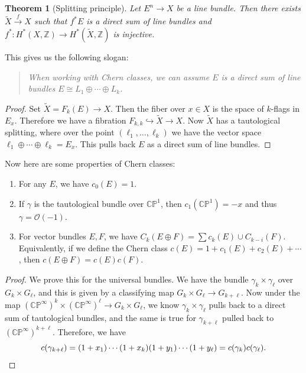 \documentclass[leqno, openany]{memoir}
\newtheorem{thm}{Theorem}[section]
\theoremstyle{definition}
\theoremstyle{remark}
\theoremstyle{plain}
\theoremstyle{definition}
\theoremstyle{remark}
\newcommand{\C}{\mathbb{C}}
\newcommand{\Z}{\mathbb{Z}}
\renewcommand{\P}{\mathbb{P}}
\newcommand{\mc}[1]{\mathcal{#1}}
\newcommand{\wt}[1]{\widetilde{#1}}
\begin{document}
\begin{thm}[Splitting principle] Let $E^n \to X$ be a line bundle. Then there
exists $\wt{X} \xrightarrow{f} X$ such that $f^* E$ is a direct sum of line
bundles and $f^* \colon H^*(X, \Z) \to H^*(\wt{X}, \Z)$ is injective.
\end{thm} This gives us the following slogan: \begin{quotation} \textit{When
working with Chern classes, we can assume $E$ is a direct sum of line bundles
$E \cong L_1 \oplus \cdots \oplus L_k$.} \end{quotation}

\begin{proof} Set $\wt{X} = F_k(E) \to X$. Then the fiber over $x \in X$ is the
    space of $k$-flags in $E_x$. Therefore we have a fibration $F_{k,k}
    \hookrightarrow \wt{X} \to X$. Now $\wt{X}$ has a tautological splitting,
    where over the point $(\ell_1, \ldots, \ell_k)$ we have the vector space
    $\ell_1 \oplus \cdots \oplus \ell_k = E_x$. This pulls back $E$ as a direct
    sum of line bundles.  \end{proof}

Now here are some properties of Chern classes: \begin{enumerate} \item For any
    $E$, we have $c_0(E) = 1$.  \item If $\gamma$ is the tautological bundle
    over $\C\P^1$, then $c_1(\C\P^1) = -x$ and thus $\gamma = \mc{O}(-1)$.
\item For vector bundles $E, F$, we have $C_k(E \oplus F) = \sum c_k(E) \cup
    C_{k-i}(F)$. Equivalently, if we define the Chern class $c(E) = 1 + c_1(E)
    + c_2(E) + \cdots$, then $c(E \oplus F) = c(E) c(F)$.  \end{enumerate}

\begin{proof} We prove this for the universal bundles. We have the bundle
    $\gamma_k \times \gamma_{\ell}$ over $G_k \times G_{\ell}$, and this is
    given by a classifying map $G_k \times G_{\ell} \to G_{k + \ell}$. Now
    under the map ${(\C\P^{\infty})}^k \times {(\C\P^{\infty})}^{\ell} \to G_k
    \times G_{\ell}$, we know $\gamma_k \times \gamma_{\ell}$ pulls back to a
    direct sum of tautological bundles, and the same is true for
    $\gamma_{k+\ell}$ pulled back to ${(\C\P^{\infty})}^{k + \ell}$. Therefore,
    we have \[ c(\gamma_{k + \ell}) = (1 + x_1) \cdots (1 + x_k) (1 + y_1)
    \cdots (1 + y_{\ell}) = c(\gamma_k) c(\gamma_{\ell}). \qedhere \]
\end{proof}
\end{document}
